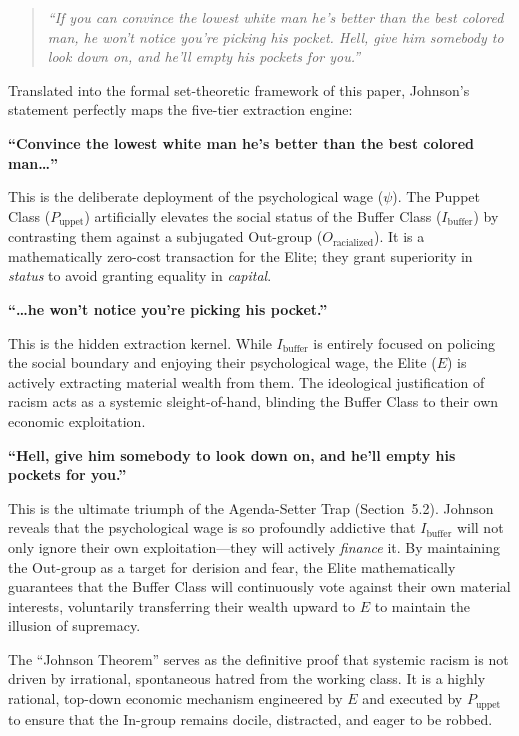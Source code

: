 \documentclass[12pt,openany]{book}
\begin{document}
\begin{quote}
\textit{``If you can convince the lowest white man he's better than the best colored man, he won't notice you're picking his pocket. Hell, give him somebody to look down on, and he'll empty his pockets for you.''}
\end{quote}

Translated into the formal set-theoretic framework of this paper, Johnson's statement perfectly maps the five-tier extraction engine:

\medskip
\noindent\textbf{``Convince the lowest white man he's better than the best colored man\ldots''}

\noindent This is the deliberate deployment of the psychological wage ($\psi$). The Puppet Class ($P_{\text{uppet}}$) artificially elevates the social status of the Buffer Class ($I_{\text{buffer}}$) by contrasting them against a subjugated Out-group ($O_{\text{racialized}}$). It is a mathematically zero-cost transaction for the Elite; they grant superiority in \textit{status} to avoid granting equality in \textit{capital}.

\medskip
\noindent\textbf{``\ldots he won't notice you're picking his pocket.''}

\noindent This is the hidden extraction kernel. While $I_{\text{buffer}}$ is entirely focused on policing the social boundary and enjoying their psychological wage, the Elite ($E$) is actively extracting material wealth from them. The ideological justification of racism acts as a systemic sleight-of-hand, blinding the Buffer Class to their own economic exploitation.

\medskip
\noindent\textbf{``Hell, give him somebody to look down on, and he'll empty his pockets for you.''}

\noindent This is the ultimate triumph of the Agenda-Setter Trap (Section~5.2). Johnson reveals that the psychological wage is so profoundly addictive that $I_{\text{buffer}}$ will not only ignore their own exploitation---they will actively \textit{finance} it. By maintaining the Out-group as a target for derision and fear, the Elite mathematically guarantees that the Buffer Class will continuously vote against their own material interests, voluntarily transferring their wealth upward to $E$ to maintain the illusion of supremacy.

\medskip
The ``Johnson Theorem'' serves as the definitive proof that systemic racism is not driven by irrational, spontaneous hatred from the working class. It is a highly rational, top-down economic mechanism engineered by $E$ and executed by $P_{\text{uppet}}$ to ensure that the In-group remains docile, distracted, and eager to be robbed.
\end{document}
